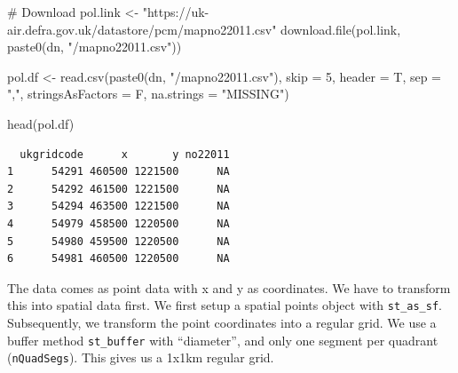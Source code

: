 \documentclass[
  letterpaper,
]{scrbook}
\newenvironment{Shaded}{\begin{snugshade}}{\end{snugshade}}
\newcommand{\AttributeTok}[1]{\textcolor[rgb]{0.40,0.45,0.13}{#1}}
\newcommand{\CommentTok}[1]{\textcolor[rgb]{0.37,0.37,0.37}{#1}}
\newcommand{\DecValTok}[1]{\textcolor[rgb]{0.68,0.00,0.00}{#1}}
\newcommand{\FunctionTok}[1]{\textcolor[rgb]{0.28,0.35,0.67}{#1}}
\newcommand{\NormalTok}[1]{\textcolor[rgb]{0.00,0.23,0.31}{#1}}
\newcommand{\OtherTok}[1]{\textcolor[rgb]{0.00,0.23,0.31}{#1}}
\newcommand{\StringTok}[1]{\textcolor[rgb]{0.13,0.47,0.30}{#1}}
\begin{document}
\begin{Shaded}
\begin{Highlighting}[]
\CommentTok{\# Download}
\NormalTok{pol.link }\OtherTok{\textless{}{-}} \StringTok{"https://uk{-}air.defra.gov.uk/datastore/pcm/mapno22011.csv"}
\FunctionTok{download.file}\NormalTok{(pol.link, }\FunctionTok{paste0}\NormalTok{(dn, }\StringTok{"/mapno22011.csv"}\NormalTok{))}
\end{Highlighting}
\end{Shaded}

\begin{Shaded}
\begin{Highlighting}[]
\NormalTok{pol.df }\OtherTok{\textless{}{-}} \FunctionTok{read.csv}\NormalTok{(}\FunctionTok{paste0}\NormalTok{(dn, }\StringTok{"/mapno22011.csv"}\NormalTok{), }\AttributeTok{skip =} \DecValTok{5}\NormalTok{, }\AttributeTok{header =}\NormalTok{ T, }\AttributeTok{sep =} \StringTok{","}\NormalTok{,}
                      \AttributeTok{stringsAsFactors =}\NormalTok{ F, }\AttributeTok{na.strings =} \StringTok{"MISSING"}\NormalTok{)}

\FunctionTok{head}\NormalTok{(pol.df)}
\end{Highlighting}
\end{Shaded}

\begin{verbatim}
  ukgridcode      x       y no22011
1      54291 460500 1221500      NA
2      54292 461500 1221500      NA
3      54294 463500 1221500      NA
4      54979 458500 1220500      NA
5      54980 459500 1220500      NA
6      54981 460500 1220500      NA
\end{verbatim}

The data comes as point data with x and y as coordinates. We have to
transform this into spatial data first. We first setup a spatial points
object with \texttt{st\_as\_sf}. Subsequently, we transform the point
coordinates into a regular grid. We use a buffer method
\texttt{st\_buffer} with ``diameter'', and only one segment per quadrant
(\texttt{nQuadSegs}). This gives us a 1x1km regular grid.
\end{document}
